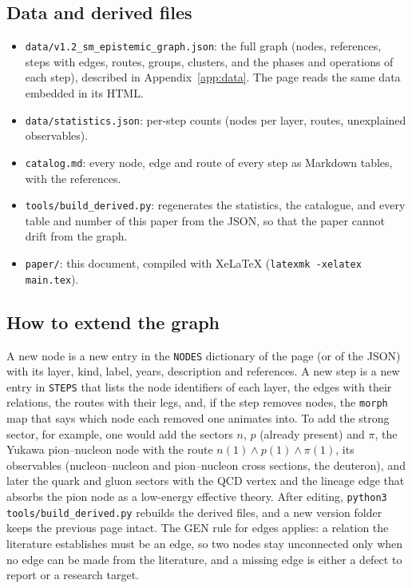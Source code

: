 \subsection{Data and derived files}
\begin{itemize}
\item \texttt{data/v1.2\_sm\_epistemic\_graph.json}: the full graph (nodes, references, steps with edges, routes, groups, clusters, and the phases and operations of each step), described in Appendix~\ref{app:data}. The page reads the same data embedded in its HTML.
\item \texttt{data/statistics.json}: per-step counts (nodes per layer, routes, unexplained observables).
\item \texttt{catalog.md}: every node, edge and route of every step as Markdown tables, with the references.
\item \texttt{tools/build\_derived.py}: regenerates the statistics, the catalogue, and every table and number of this paper from the JSON, so that the paper cannot drift from the graph.
\item \texttt{paper/}: this document, compiled with XeLaTeX (\texttt{latexmk -xelatex main.tex}).
\end{itemize}

\subsection{How to extend the graph}
A new node is a new entry in the \texttt{NODES} dictionary of the page (or of the JSON) with its layer, kind, label, years, description and references. A new step is a new entry in \texttt{STEPS} that lists the node identifiers of each layer, the edges with their relations, the routes with their legs, and, if the step removes nodes, the \texttt{morph} map that says which node each removed one animates into. To add the strong sector, for example, one would add the sectors $n$, $p$ (already present) and $\pi$, the Yukawa pion--nucleon node with the route $n(1)\wedge p(1)\wedge\pi(1)$, its observables (nucleon--nucleon and pion--nucleon cross sections, the deuteron), and later the quark and gluon sectors with the QCD vertex and the lineage edge that absorbs the pion node as a low-energy effective theory. After editing, \texttt{python3 tools/build\_derived.py} rebuilds the derived files, and a new version folder keeps the previous page intact. The GEN rule for edges applies: a relation the literature establishes must be an edge, so two nodes stay unconnected only when no edge can be made from the literature, and a missing edge is either a defect to report or a research target.
